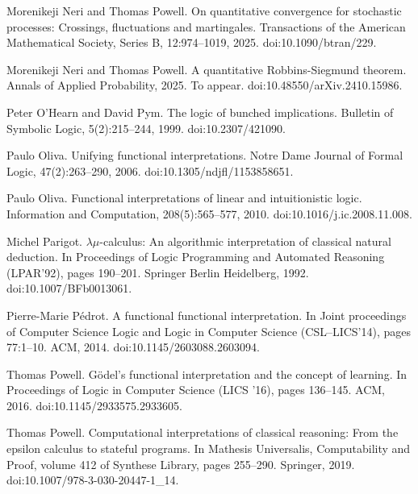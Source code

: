 \par\noindent  [27]  Morenikeji Neri and Thomas Powell.  On quantitative convergence for stochastic processes: Crossings, fluctuations and martingales.  Transactions of the American Mathematical Society, Series B, 12:974–1019, 2025.  doi:10.1090/btran/229.  
 
\par\noindent  [28]  Morenikeji Neri and Thomas Powell.  A quantitative Robbins-Siegmund theorem.  Annals of Applied Probability, 2025.  To appear.  doi:10.48550/arXiv.2410.15986.  
 
\par\noindent  [29]  Peter O’Hearn and David Pym.  The logic of bunched implications.  Bulletin of Symbolic Logic, 5(2):215–244, 1999.  doi:10.2307/421090.  
 
\par\noindent  [30]  Paulo Oliva.  Unifying functional interpretations.  Notre Dame Journal of Formal Logic, 47(2):263–290, 2006.  doi:10.1305/ndjfl/1153858651.  
 
\par\noindent  [31]  Paulo Oliva.  Functional interpretations of linear and intuitionistic logic.  Information and Computation, 208(5):565–577, 2010.  doi:10.1016/j.ic.2008.11.008.  
 
\par\noindent  [32]  Michel Parigot.  $\lambda\mu$-calculus: An algorithmic interpretation of classical natural deduction.  In Proceedings of Logic Programming and Automated Reasoning (LPAR’92), pages 190–201. Springer Berlin Heidelberg, 1992.  doi:10.1007/BFb0013061.  
 
\par\noindent  [33]  Pierre-Marie Pédrot.  A functional functional interpretation.  In Joint proceedings of Computer Science Logic and Logic in Computer Science (CSL–LICS’14), pages 77:1–10. ACM, 2014.  doi:10.1145/2603088.2603094.  
 
\par\noindent  [34]  Thomas Powell.  Gödel’s functional interpretation and the concept of learning.  In Proceedings of Logic in Computer Science (LICS ’16), pages 136–145. ACM, 2016.  doi:10.1145/2933575.2933605.  
 
\par\noindent  [35]  Thomas Powell.  Computational interpretations of classical reasoning: From the epsilon calculus to stateful programs.  In Mathesis Universalis, Computability and Proof, volume 412 of Synthese Library, pages 255–290. Springer, 2019.  doi:10.1007/978-3-030-20447-1\_14.  
 
